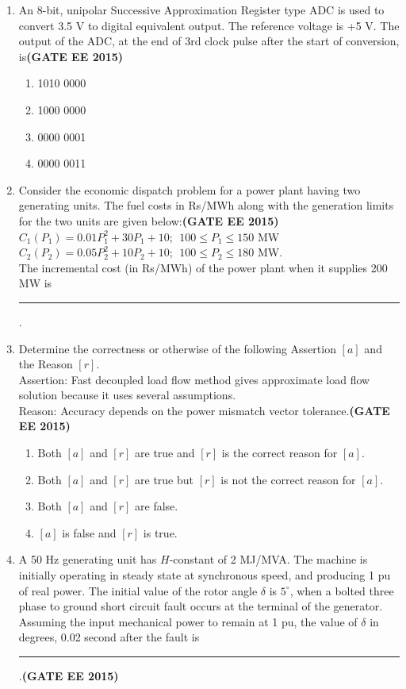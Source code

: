 \documentclass[a4paper,12pt]{exam}
\theoremstyle{remark}
\begin{document}
\begin{enumerate}
\item An 8-bit, unipolar Successive Approximation Register type ADC is used to convert 3.5 V to digital equivalent output. The reference voltage is +5 V. The output of the ADC, at the end of 3rd clock pulse after the start of conversion, is\hfill{\textbf{(GATE EE 2015)}}
\begin{multicols}{4}
    \begin{enumerate}
        \item 1010 0000
        \item 1000 0000
        \item 0000 0001
        \item 0000 0011
    \end{enumerate}
\end{multicols}
\item Consider the economic dispatch problem for a power plant having two generating units. The fuel costs in Rs/MWh along with the generation limits for the two units are given below:\hfill{\textbf{(GATE EE 2015)}}\\
$C_1(P_1) = 0.01P_1^2 + 30P_1 + 10;\ \ 100 \leq P_1 \leq 150$ MW\\
$C_2(P_2) = 0.05P_2^2 + 10P_2 + 10;\ \ 100 \leq P_2 \leq 180$ MW.\\
The incremental cost (in Rs/MWh) of the power plant when it supplies 200 MW is \rule{2cm}{0.15mm}.

\item Determine the correctness or otherwise of the following Assertion $[a]$ and the Reason $[r]$.\\
Assertion: Fast decoupled load flow method gives approximate load flow solution because it uses several assumptions.\\
Reason: Accuracy depends on the power mismatch vector tolerance.\hfill{\textbf{(GATE EE 2015)}}
    \begin{enumerate}
        \item Both $[a]$ and $[r]$ are true and $[r]$ is the correct reason for $[a]$.
        \item Both $[a]$ and $[r]$ are true but $[r]$ is not the correct reason for $[a]$.
        \item Both $[a]$ and $[r]$ are false.
        \item $[a]$ is false and $[r]$ is true.
    \end{enumerate}

\item A 50 Hz generating unit has $H$-constant of 2 MJ/MVA. The machine is initially operating in steady state at synchronous speed, and producing 1 pu of real power. The initial value of the rotor angle $\delta$ is $5^\circ$, when a bolted three phase to ground short circuit fault occurs at the terminal of the generator. Assuming the input mechanical power to remain at 1 pu, the value of $\delta$ in degrees, 0.02 second after the fault is \rule{3cm}{0.15mm}.\hfill{\textbf{(GATE EE 2015)}}


\end{enumerate}
\end{document}
